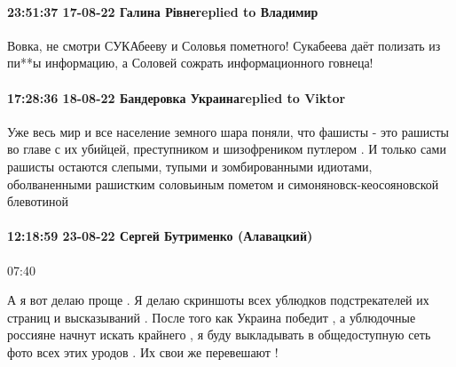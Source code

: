  
 
 
 
 

\paragraph{23:51:37 17-08-22 Галина Рівнеreplied to Владимир}

Вовка, не смотри СУКАбееву и Соловья пометного! Сукабеева даёт полизать из
пи**ы информацию, а Соловей сожрать информационного говнеца!

\paragraph{17:28:36 18-08-22 Бандеровка Украинаreplied to Viktor}

Уже весь мир и все население земного шара поняли, что фашисты - это рашисты во
главе с их убийцей, преступником и шизофреником путлером . И только сами
рашисты остаются слепыми, тупыми и зомбированными идиотами, оболваненными
рашистким соловьиным пометом и симоняновск-кеосояновской блевотиной

\paragraph{12:18:59 23-08-22 Сергей Бутрименко (Алавацкий)}

07:40

А я вот делаю проще . Я делаю скриншоты всех ублюдков подстрекателей их страниц
и высказываний . После того как Украина победит , а ублюдочные россияне начнут
искать крайнего , я буду выкладывать в общедоступную сеть фото всех этих уродов
. Их свои же перевешают !
